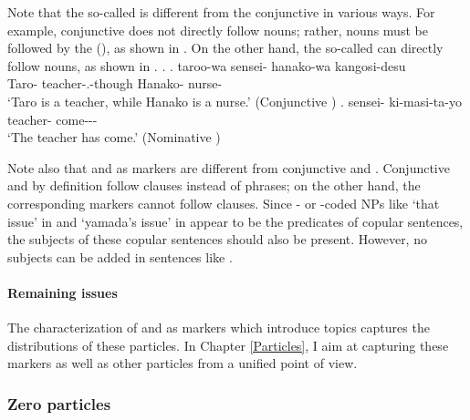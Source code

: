 Note that the so-called   is different from
the conjunctive  in various ways.
For example,
conjunctive  does not directly follow nouns; rather, nouns must be followed by the  (), as shown in \Next[a].
On the other hand, the so-called   can directly follow nouns,
as shown in \Next[b].
%
\ex.
 \ag. taroo-wa sensei- hanako-wa kangosi-desu \\
      Taro- teacher-.-though Hanako- nurse- \\
      `Taro is a teacher, while Hanako is a nurse.'
      \hfill{(Conjunctive )}
 \bg. sensei- ki-masi-ta-yo \\
      teacher- come--- \\
      `The teacher has come.'
      \hfill{(Nominative )}


Note also that  and  as  markers are different from
conjunctive  and .
Conjunctive  and  by definition follow clauses
instead of phrases;
on the other hand,
the corresponding  markers cannot follow clauses.
Since - or -coded NPs like  `that issue' in \LLast[a] and  `yamada's issue' in \LLast[b]
appear to be the predicates of copular sentences,
the subjects of these copular sentences should also be present. %
However, no subjects can be added in sentences like \LLast.

\paragraph{Remaining issues}

The characterization of  and  as  markers
which introduce topics captures the distributions of these particles.
In Chapter \ref{Particles},
I aim at capturing these markers as well as other  particles from a unified point of view.


\subsubsection{Zero particles}\label{BackSubSubZero}

